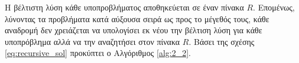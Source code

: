 		Η βέλτιστη λύση κάθε υποπροβλήματος αποθηκεύεται σε έναν πίνακα $R$. Επομένως, λύνοντας τα προβλήματα κατά αύξουσα σειρά ως προς το μέγεθός τους, κάθε αναδρομή δεν χρειάζεται να υπολογίσει εκ νέου την βέλτιση λύση για κάθε υποπρόβλημα αλλά να την αναζητήσει στον πίνακα $R$. Βάσει της σχέσης \eqref{eq:recursive_sol} προκύπτει ο Αλγόριθμος \ref{alg:2_2}.


